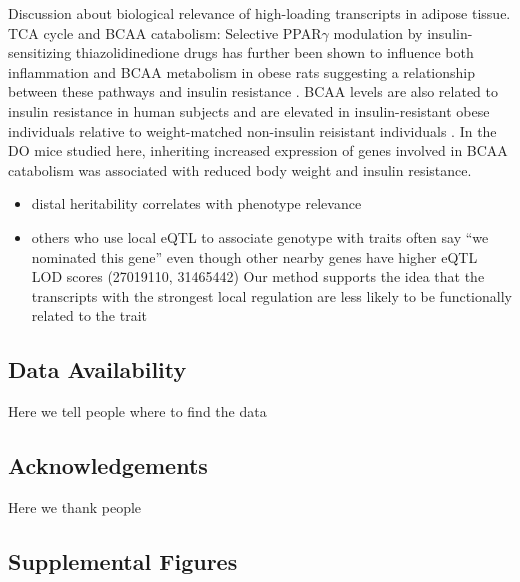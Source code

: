 \documentclass[
]{article}
\begin{document}
Discussion about biological relevance of high-loading transcripts in
adipose tissue. TCA cycle and BCAA catabolism: Selective PPAR\(\gamma\)
modulation by insulin-sensitizing thiazolidinedione drugs has further
been shown to influence both inflammation and BCAA metabolism in obese
rats suggesting a relationship between these pathways and insulin
resistance \cite{pmid20959535}. BCAA levels are also related to insulin
resistance in human subjects and are elevated in insulin-resistant obese
individuals relative to weight-matched non-insulin reisistant
individuals \cite{pmid23512805}. In the DO mice studied here, inheriting
increased expression of genes involved in BCAA catabolism was associated
with reduced body weight and insulin resistance.

\begin{itemize}
\item
  distal heritability correlates with phenotype relevance
\item
  others who use local eQTL to associate genotype with traits often say
  ``we nominated this gene'' even though other nearby genes have higher
  eQTL LOD scores (27019110, 31465442) Our method supports the idea that
  the transcripts with the strongest local regulation are less likely to
  be functionally related to the trait
\end{itemize}

\subsection{Data Availability}\label{data-availability}

Here we tell people where to find the data

\subsection{Acknowledgements}\label{acknowledgements}

Here we thank people

\pagebreak

\subsection{Supplemental Figures}\label{supplemental-figures}
\end{document}

